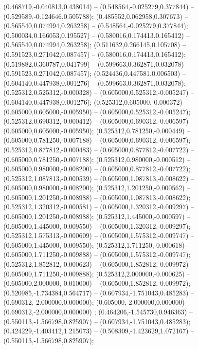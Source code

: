  (0.468719,-0.040813,0.438014) -- (0.548564,-0.025279,0.377844) -- (0.529589,-0.124646,0.505788);
 (0.485552,0.062958,0.307673) -- (0.565540,0.074994,0.263258) -- (0.548564,-0.025279,0.377844);
 (0.500034,0.166053,0.195527) -- (0.580016,0.174413,0.165412) -- (0.565540,0.074994,0.263258);
 (0.511632,0.266145,0.105708) -- (0.591523,0.271042,0.087457) -- (0.580016,0.174413,0.165412);
 (0.519882,0.360787,0.041799) -- (0.599663,0.362871,0.032078) -- (0.591523,0.271042,0.087457);
 (0.524436,0.447581,0.006503) -- (0.604140,0.447938,0.001276) -- (0.599663,0.362871,0.032078);
 (0.525312,0.525312,-0.000328) -- (0.605000,0.525312,-0.005247) -- (0.604140,0.447938,0.001276);
 (0.525312,0.605000,-0.000372) -- (0.605000,0.605000,-0.005950) -- (0.605000,0.525312,-0.005247);
 (0.525312,0.690312,-0.000412) -- (0.605000,0.690312,-0.006597) -- (0.605000,0.605000,-0.005950);
 (0.525312,0.781250,-0.000449) -- (0.605000,0.781250,-0.007188) -- (0.605000,0.690312,-0.006597);
 (0.525312,0.877812,-0.000483) -- (0.605000,0.877812,-0.007722) -- (0.605000,0.781250,-0.007188);
 (0.525312,0.980000,-0.000512) -- (0.605000,0.980000,-0.008200) -- (0.605000,0.877812,-0.007722);
 (0.525312,1.087813,-0.000539) -- (0.605000,1.087813,-0.008622) -- (0.605000,0.980000,-0.008200);
 (0.525312,1.201250,-0.000562) -- (0.605000,1.201250,-0.008988) -- (0.605000,1.087813,-0.008622);
 (0.525312,1.320312,-0.000581) -- (0.605000,1.320312,-0.009297) -- (0.605000,1.201250,-0.008988);
 (0.525312,1.445000,-0.000597) -- (0.605000,1.445000,-0.009550) -- (0.605000,1.320312,-0.009297);
 (0.525312,1.575313,-0.000609) -- (0.605000,1.575312,-0.009747) -- (0.605000,1.445000,-0.009550);
 (0.525312,1.711250,-0.000618) -- (0.605000,1.711250,-0.009888) -- (0.605000,1.575312,-0.009747);
 (0.525312,1.852812,-0.000623) -- (0.605000,1.852812,-0.009972) -- (0.605000,1.711250,-0.009888);
 (0.525312,2.000000,-0.000625) -- (0.605000,2.000000,-0.010000) -- (0.605000,1.852812,-0.009972);
 (0.520985,-1.734384,0.564717) -- (0.607934,-1.751043,0.485283) -- (0.690312,-2.000000,0.000000);
 (0.605000,-2.000000,0.000000) -- (0.690312,-2.000000,0.000000) ;
 (0.464206,-1.545730,0.946363) -- (0.550113,-1.566798,0.825907) -- (0.607934,-1.751043,0.485283);
 (0.424229,-1.403412,1.215073) -- (0.508309,-1.423629,1.072167) -- (0.550113,-1.566798,0.825907);
